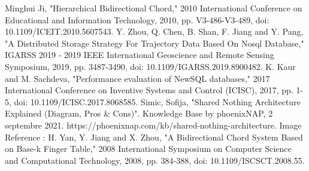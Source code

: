 \documentclass{article}
\begin{document}
\begin{thebibliography}{9}
Minghui Ji, "Hierarchical Bidirectional Chord," 2010 International Conference on Educational and Information Technology, 2010, pp. V3-486-V3-489, doi: 10.1109/ICEIT.2010.5607543.
Y. Zhou, Q. Chen, B. Shan, F. Jiang and Y. Pang, "A Distributed Storage Strategy For Trajectory Data Based On Nosql Database," IGARSS 2019 - 2019 IEEE International Geoscience and Remote Sensing Symposium, 2019, pp. 3487-3490, doi: 10.1109/IGARSS.2019.8900482.
K. Kaur and M. Sachdeva, "Performance evaluation of NewSQL databases," 2017 International Conference on Inventive Systems and Control (ICISC), 2017, pp. 1-5, doi: 10.1109/ICISC.2017.8068585.
Simic, Sofija, "Shared Nothing Architecture Explained (Diagram, Pros \& Cons)". Knowledge Base by phoenixNAP, 2 septembre 2021. https://phoenixnap.com/kb/shared-nothing-architecture.
Image Reference : H. Yan, Y. Jiang and X. Zhou, "A Bidirectional Chord System Based on Base-k Finger Table," 2008 International Symposium on Computer Science and Computational Technology, 2008, pp. 384-388, doi: 10.1109/ISCSCT.2008.55.
\end{thebibliography}

\pagebreak

\appendix
\end{document}
